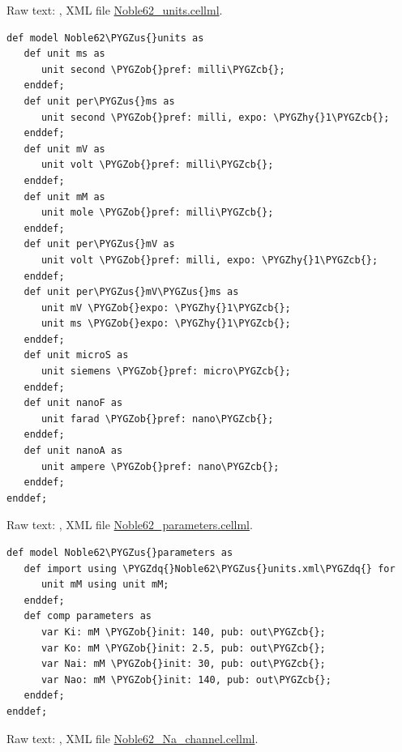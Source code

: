 \documentclass[a4paper,10pt,english]{sphinxmanual}
\def\PYGZus{\char`\_}
\def\PYGZob{\char`\{}
\def\PYGZcb{\char`\}}
\def\PYGZhy{\char`\-}
\def\PYGZdq{\char`\"}
\begin{document}
Raw text: , XML file \href{https://models.physiomeproject.org/workspace/25d/rawfile/aec9dd2760d3512135605017226531ac1d4d0d0f/Noble62\_units.cellml}{Noble62\_units.cellml}.

\begin{Verbatim}[commandchars=\\\{\}]
def model Noble62\PYGZus{}units as
   def unit ms as
      unit second \PYGZob{}pref: milli\PYGZcb{};
   enddef;
   def unit per\PYGZus{}ms as
      unit second \PYGZob{}pref: milli, expo: \PYGZhy{}1\PYGZcb{};
   enddef;
   def unit mV as
      unit volt \PYGZob{}pref: milli\PYGZcb{};
   enddef;
   def unit mM as
      unit mole \PYGZob{}pref: milli\PYGZcb{};
   enddef;
   def unit per\PYGZus{}mV as
      unit volt \PYGZob{}pref: milli, expo: \PYGZhy{}1\PYGZcb{};
   enddef;
   def unit per\PYGZus{}mV\PYGZus{}ms as
      unit mV \PYGZob{}expo: \PYGZhy{}1\PYGZcb{};
      unit ms \PYGZob{}expo: \PYGZhy{}1\PYGZcb{};
   enddef;
   def unit microS as
      unit siemens \PYGZob{}pref: micro\PYGZcb{};
   enddef;
   def unit nanoF as
      unit farad \PYGZob{}pref: nano\PYGZcb{};
   enddef;
   def unit nanoA as
      unit ampere \PYGZob{}pref: nano\PYGZcb{};
   enddef;
enddef;
\end{Verbatim}

Raw text: , XML file \href{https://models.physiomeproject.org/workspace/25d/rawfile/aec9dd2760d3512135605017226531ac1d4d0d0f/Noble62\_parameters.cellml}{Noble62\_parameters.cellml}.

\begin{Verbatim}[commandchars=\\\{\}]
def model Noble62\PYGZus{}parameters as
   def import using \PYGZdq{}Noble62\PYGZus{}units.xml\PYGZdq{} for
      unit mM using unit mM;
   enddef;
   def comp parameters as
      var Ki: mM \PYGZob{}init: 140, pub: out\PYGZcb{};
      var Ko: mM \PYGZob{}init: 2.5, pub: out\PYGZcb{};
      var Nai: mM \PYGZob{}init: 30, pub: out\PYGZcb{};
      var Nao: mM \PYGZob{}init: 140, pub: out\PYGZcb{};
   enddef;
enddef;
\end{Verbatim}

Raw text: , XML file \href{https://models.physiomeproject.org/workspace/25d/rawfile/aec9dd2760d3512135605017226531ac1d4d0d0f/Noble62\_Na\_channel.cellml}{Noble62\_Na\_channel.cellml}.
\end{document}
